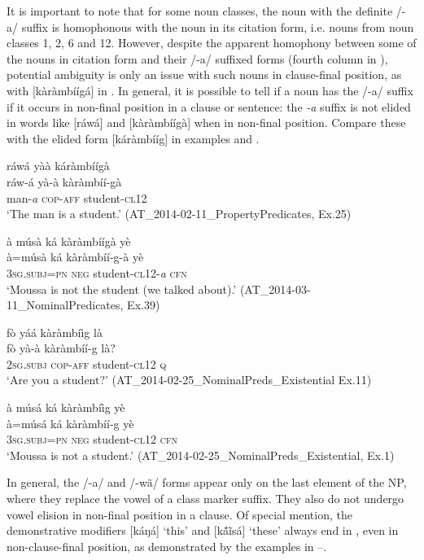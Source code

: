 \documentclass[output=paper]{langsci/langscibook}
\begin{document}
It is important to note that for some noun classes, the noun with the definite /-a/ suffix is homophonous with the noun in its citation form, i.e. nouns from noun classes 1, 2, 6 and 12. However, despite the apparent homophony between some of the nouns in citation form and their /-a/ suffixed forms (fourth column in ), potential ambiguity is only an issue with such nouns in clause-final position, as with [kàràmbíígá] in . In general, it is possible to tell if a noun has the /-a/ suffix if it occurs in non-final position in a clause or sentence: the \textit{-a} suffix is not elided in words like [ráwá]  and [kàràmbíígà]  when in non-final position. Compare these with the elided form [káràmbííg] in examples  and .

\ea\label{ex:teo:17}
\glll ráwá yàà káràmbíígà\\
ráw-á yà-à kàràmbíí-gà\\
man-\textit{a} \textsc{cop-aff} student-\textsc{cl12}\\
\glt ‘The man is a student.’ (AT\_2014-02-11\_PropertyPredicates, Ex.25)
\z


\ea\label{ex:teo:18}
\glll à músà ká kàràmbíígà yè\\
à=músà ká kàràmbíí-g-à yè \\
3\textsc{sg.subj=pn} \textsc{neg} student-\textsc{cl}12-\textit{a} \textsc{cfn}\\
\glt ‘Moussa is not the student (we talked about).’ (AT\_2014-03-11\_NominalPredicates, Ex.39)
\z

\ea\label{ex:teo:19}
\glll fò yáá kàràmbíìg là\\
 fò yà-à kàràmbíí-g là?\\
2\textsc{sg.subj} \textsc{cop-aff} student-\textsc{cl}12 \textsc{q}\\
\glt ‘Are you a student?’ (AT\_2014-02-25\_NominalPreds\_Existential Ex.11)
\z

\ea\label{ex:teo:20}
\glll à músá ká kàràmbíìg yè\\
 à=músá ká kàràmbíí-g yè\\
3\textsc{sg.subj=pn} \textsc{neg} student-\textsc{cl}12 \textsc{cfn}\\
\glt ‘Moussa is not a student.’ (AT\_2014-02-25\_NominalPreds\_Existential, Ex.1)
\z

In general, the /-a/ and /-wã/ forms appear only on the last element of the NP, where they replace the vowel of a class marker suffix. They also do not undergo vowel elision in non-final position in a clause. Of special mention, the demonstrative modifiers [káŋá] ‘this’ and [k\'{ã}\~{i}sá] ‘these’ always end in \-[-a], even in non-clause-final position, as demonstrated by the examples in –.
\end{document}
